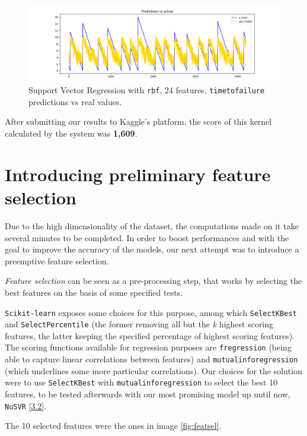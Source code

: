 \begin{figure} [h]
	\centering
	\includegraphics[width=1\linewidth]{pictures/nu_svr_24f.png}
	\caption{Support Vector Regression with \texttt{rbf}, 24 features, \texttt{time\textunderscore to\textunderscore failure} predictions vs real values.}
	\label{fig:SVR}
\end{figure}

After submitting our results to Kaggle's platform, the score of this kernel calculated by the system was \textbf{1,609}.

\section[Feature selection]{Introducing preliminary feature selection}
Due to the high dimensionality of the dataset, the computations made on it take several minutes to be completed. In order to boost performances and with the goal to improve the accuracy of the models, our next attempt was to introduce a preemptive feature selection.

\textit{Feature selection} can be seen as a pre-processing step, that works by selecting the best features on the basis of some specified tests.

\texttt{Scikit-learn} exposes some choices for this purpose, among which \texttt{SelectKBest} and \texttt{SelectPercentile} (the former removing all but the \textit{k} highest scoring features, the latter keeping the specified percentage of highest scoring features). The scoring functions available for regression purposes are \texttt{f\textunderscore regression} (being able to capture linear correlations between features) and \texttt{mutual\textunderscore info\textunderscore regression} (which underlines some more particular correlations). Our choices for the solution were to use \texttt{SelectKBest} with \texttt{mutual\textunderscore info\textunderscore regression} to select the best 10 features, to be tested afterwards with our most promising model up until now, \texttt{NuSVR} \ref{3.2}.

The 10 selected features were the ones in image \ref{fig:featsel}.

